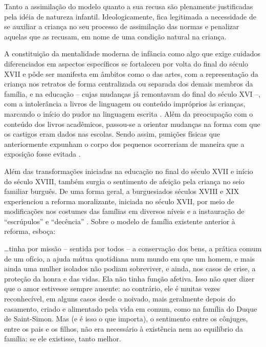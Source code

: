 \begin{citacao}
	Tanto a assimilação do modelo quanto a sua recusa são plenamente justificadas pela idéia de natureza infantil. Ideologicamente, fica legitimada a necessidade de se auxiliar a criança no seu processo de assimilação das normas e penalizar aquelas que as recusam, em nome de uma condição natural na criança.
\end{citacao}

A constituição da mentalidade moderna de infância como algo que exige cuidados diferenciados em aspectos específicos se fortaleceu por volta do final do século XVII e pôde ser manifesta em âmbitos como o das artes\footnotemark, com a representação da criança nos retratos de forma centralizada ou separada dos demais membros da família, e na educação -- cujas mudanças já remontavam do final do século XVI --, com a intolerância a livros de linguagem ou conteúdo impróprios às crianças, marcando o início do pudor na linguagem escrita \cite{ARIES2011}. Além da preocupação com o conteúdo dos livros acadêmicos, passou-se a orientar mudanças na forma com que os castigos eram dados nas escolas. Sendo assim, punições físicas que anteriormente expunham o corpo dos pequenos ocorreriam de maneira que a exposição fosse evitada \cite{ARIES1981}.


Além das transformações iniciadas na educação no final do século XVII e início do século XVIII, também surgia o sentimento de afeição pela criança no seio familiar burguês. De uma forma geral, a burguesia\footnotemark dos séculos XVIII e XIX experienciou a reforma moralizante, iniciada no século XVII, por meio de modificações nos costumes das famílias em diversos níveis e a instauração de ``escrúpulos'' e ``decência'' \cite[p. 77]{ARIES2011}. Sobre o modelo de família existente anterior à reforma,  esboça:

\begin{citacao}
	\ldots tinha por missão -- sentida por todos -- a conservação dos bens, a prática comum de um ofício, a ajuda mútua quotidiana num mundo em que um homem, e mais ainda uma mulher isolados não podiam sobreviver, e ainda, nos casos de crise, a proteção da honra e das vidas. Ela não tinha função afetiva. Isso não quer dizer que o amor estivesse sempre ausente: ao contrário, ele é muitas vezes reconhecível, em alguns casos desde o noivado, mais geralmente depois do casamento, criado e alimentado pela vida em comum, como na família do Duque de Saint-Simon. Mas (e é isso o que importa), o sentimento entre os cônjuges, entre os pais e os filhos, não era necessário à existência nem ao equilíbrio da família: se ele existisse, tanto melhor.
\end{citacao}

